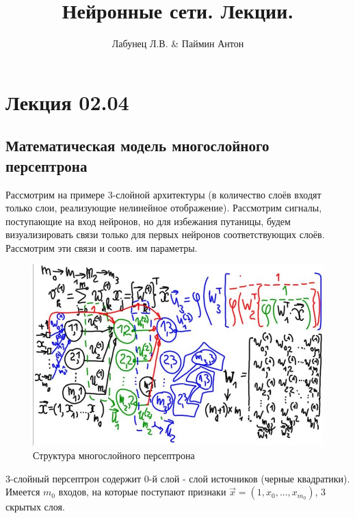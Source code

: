\documentclass{article}
\numberwithin{equation}{subsection}
\begin{document}
\author{Лабунец Л.В. \& Паймин Антон}
\title{Нейронные сети. Лекции.}

\makeatletter
\begin{center}
    {\fontsize{14pt}{24pt}\selectfont\bfseries\@title\par}
    {\fontsize{14pt}{16pt}\@author\par}
\end{center}
\makeatother

\tableofcontents

\section{Лекция 02.04}

\subsection{Математическая модель многослойного персептрона}

Рассмотрим на примере 3-слойной архитектуры (в количество слоёв входят только 
слои, реализующие нелинейное отображение).
Рассмотрим сигналы, поступающие на вход нейронов, но для избежания 
путаницы, будем визуализировать связи только для первых нейронов соответствующих слоёв.
Рассмотрим эти связи и соотв. им параметры.

\begin{figure}[htbp]
    \centering
    \includegraphics[width=\textwidth]{hyperflat_3_1.jpeg}
    \caption{Структура многослойного персептрона}
    \label{hyperflat_3_1}
\end{figure}

3-слойный персептрон содержит 0-й слой - слой источников (черные квадратики). 
Имеется $m_{0}$ входов, на которые поступают признаки 
$\vec{x} = (1, x_0, ..., x_{m_{0}})$, 3 скрытых слоя.
\end{document}
